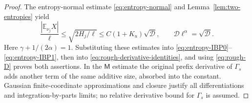 \documentclass[11pt,a4paper]{amsart}
\theoremstyle{plain}
\theoremstyle{definition}
\theoremstyle{remark}
\newcommand{\EE}{\mathbb{E}}
\begin{document}
\begin{proof}
The entropy-normal estimate \eqref{eq:entropy-normal} and Lemma~\ref{lem:two-entropies} yield
\begin{equation}\label{eq:entropy-smoothing}
 \frac{|\EE_{\nu_j}X|}{\ell}\le\sqrt{2H_j/\ell}
       \le C(1+K_u)\sqrt{\mathscr D},\qquad
 \mathscr D\ell^\alpha=\sqrt{\mathscr D}.
\end{equation}
Here $\gamma+1/(2\alpha)=1$. Substituting these estimates into \eqref{eq:entropy-IBP0}--\eqref{eq:entropy-IBP1}, then into \eqref{eq:rough-derivative-identities}, and using \eqref{eq:rough-D} proves both assertions. In the $\mathsf M$ estimate the original prefix derivative of $\Gamma_s$ adds another term of the same additive size, absorbed into the constant. Gaussian finite-coordinate approximations and closure justify all differentiations and integration-by-parts limits; no relative derivative bound for $\Gamma_s$ is assumed.
\end{proof}
\end{document}
